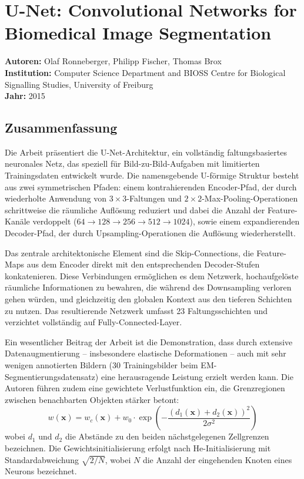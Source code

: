 \documentclass[a4paper,12pt]{article}
\begin{document}
\section*{U-Net: Convolutional Networks for Biomedical Image Segmentation}

\textbf{Autoren:} Olaf Ronneberger, Philipp Fischer, Thomas Brox \\
\textbf{Institution:} Computer Science Department and BIOSS Centre for Biological Signalling Studies, University of Freiburg \\
\textbf{Jahr:} 2015

\subsection*{Zusammenfassung}

Die Arbeit präsentiert die U-Net-Architektur, ein vollständig faltungsbasiertes neuronales Netz, das speziell für Bild-zu-Bild-Aufgaben mit limitierten Trainingsdaten entwickelt wurde. Die namensgebende U-förmige Struktur besteht aus zwei symmetrischen Pfaden: einem kontrahierenden Encoder-Pfad, der durch wiederholte Anwendung von $3 \times 3$-Faltungen und $2 \times 2$-Max-Pooling-Operationen schrittweise die räumliche Auflösung reduziert und dabei die Anzahl der Feature-Kanäle verdoppelt ($64 \rightarrow 128 \rightarrow 256 \rightarrow 512 \rightarrow 1024$), sowie einem expandierenden Decoder-Pfad, der durch Upsampling-Operationen die Auflösung wiederherstellt.

Das zentrale architektonische Element sind die Skip-Connections, die Feature-Maps aus dem Encoder direkt mit den entsprechenden Decoder-Stufen konkatenieren. Diese Verbindungen ermöglichen es dem Netzwerk, hochaufgelöste räumliche Informationen zu bewahren, die während des Downsampling verloren gehen würden, und gleichzeitig den globalen Kontext aus den tieferen Schichten zu nutzen. Das resultierende Netzwerk umfasst 23 Faltungsschichten und verzichtet vollständig auf Fully-Connected-Layer.

Ein wesentlicher Beitrag der Arbeit ist die Demonstration, dass durch extensive Datenaugmentierung -- insbesondere elastische Deformationen -- auch mit sehr wenigen annotierten Bildern (30 Trainingsbilder beim EM-Segmentierungsdatensatz) eine herausragende Leistung erzielt werden kann. Die Autoren führen zudem eine gewichtete Verlustfunktion ein, die Grenzregionen zwischen benachbarten Objekten stärker betont:
\begin{equation}
    w(\mathbf{x}) = w_c(\mathbf{x}) + w_0 \cdot \exp\left(-\frac{(d_1(\mathbf{x}) + d_2(\mathbf{x}))^2}{2\sigma^2}\right)
\end{equation}
wobei $d_1$ und $d_2$ die Abstände zu den beiden nächstgelegenen Zellgrenzen bezeichnen. Die Gewichtsinitialisierung erfolgt nach He-Initialisierung mit Standardabweichung $\sqrt{2/N}$, wobei $N$ die Anzahl der eingehenden Knoten eines Neurons bezeichnet.
\end{document}
